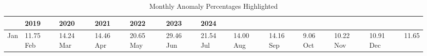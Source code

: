 \begin{table}
\caption{Monthly Anomaly Percentages Highlighted}
\label{tab:anomaly_percentages}
\begin{tabular}{lllllll}
\toprule
 & 2019 & 2020 & 2021 & 2022 & 2023 & 2024 \\
\midrule
Jan & 11.75%
Feb & 14.24%
Mar & 14.46%
Apr & 20.65%
May & 29.46%
Jun & 21.54%
Jul & 14.00%
Aug & 14.16%
Sep & 9.06%
Oct & 10.22%
Nov & 10.91%
Dec & 11.65%
\bottomrule
\end{tabular}
\end{table}
